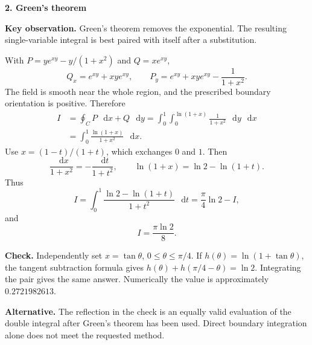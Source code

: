 \documentclass[11pt,letterpaper]{article}
\newcommand{\dd}{\mathop{}\!\mathrm{d}}
\newcommand{\solutionproblem}[3]{%
  \par\bigskip\Needspace{7\baselineskip}
  \noindent\textbf{#1. #2}\par\nobreak
}
\newcommand{\insight}[1]{\par\textbf{Key observation.} #1\par}
\newcommand{\verification}[1]{\par\textbf{Check.} #1\par}
\newcommand{\alternative}[1]{\par\textbf{Alternative.} #1\par}
\begin{document}
\solutionproblem{2}{Green's theorem}{12}
\insight{Green's theorem removes the exponential. The resulting
single-variable integral is best paired with itself after a substitution.}
With $P=ye^{xy}-y/(1+x^2)$ and $Q=xe^{xy}$,
\[
Q_x=e^{xy}+xye^{xy},\qquad
P_y=e^{xy}+xye^{xy}-\frac1{1+x^2}.
\]
The field is smooth near the whole region, and the prescribed boundary
orientation is positive. Therefore
\[
\begin{aligned}
I&=\oint_C P\,\dd x+Q\,\dd y
=\int_0^1\int_0^{\ln(1+x)}\frac1{1+x^2}\,\dd y\,\dd x\\
&=\int_0^1\frac{\ln(1+x)}{1+x^2}\,\dd x.
\end{aligned}
\]
Use $x=(1-t)/(1+t)$, which exchanges $0$ and $1$. Then
\[
\frac{\dd x}{1+x^2}=-\frac{\dd t}{1+t^2},\qquad
\ln(1+x)=\ln2-\ln(1+t).
\]
Thus
\[
I=\int_0^1\frac{\ln2-\ln(1+t)}{1+t^2}\,\dd t
=\frac\pi4\ln2-I,
\]
and
\[
\boxed{I=\frac{\pi\ln2}{8}.}
\]
\verification{Independently set $x=\tan\theta$, $0\le\theta\le\pi/4$.
If $h(\theta)=\ln(1+\tan\theta)$, the tangent subtraction formula gives
$h(\theta)+h(\pi/4-\theta)=\ln2$. Integrating the pair gives the same
answer. Numerically the value is approximately $0.2721982613$.}
\alternative{The reflection in the check is an equally valid evaluation
of the double integral after Green's theorem has been used. Direct
boundary integration alone does not meet the requested method.}
\end{document}
